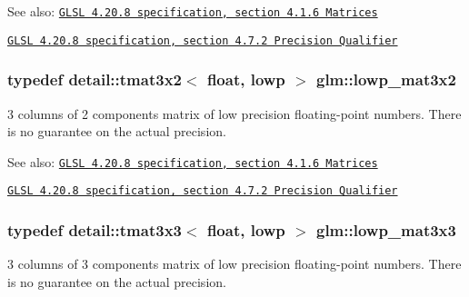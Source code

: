 \begin{Desc}
\item[See also:]\href{http://www.opengl.org/registry/doc/GLSLangSpec.4.20.8.pdf}{\tt GLSL 4.20.8 specification, section 4.1.6 Matrices} 

\href{http://www.opengl.org/registry/doc/GLSLangSpec.4.20.8.pdf}{\tt GLSL 4.20.8 specification, section 4.7.2 Precision Qualifier} \end{Desc}
\hypertarget{group__core__precision_g17219f89f804dbf4620d4caacf32cfe2}{
\subsubsection[lowp\_\-mat3x2]{\setlength{\rightskip}{0pt plus 5cm}typedef detail::tmat3x2$<$ float, lowp $>$ {\bf glm::lowp\_\-mat3x2}}}
\label{group__core__precision_g17219f89f804dbf4620d4caacf32cfe2}


3 columns of 2 components matrix of low precision floating-point numbers. There is no guarantee on the actual precision.

\begin{Desc}
\item[See also:]\href{http://www.opengl.org/registry/doc/GLSLangSpec.4.20.8.pdf}{\tt GLSL 4.20.8 specification, section 4.1.6 Matrices} 

\href{http://www.opengl.org/registry/doc/GLSLangSpec.4.20.8.pdf}{\tt GLSL 4.20.8 specification, section 4.7.2 Precision Qualifier} \end{Desc}
\hypertarget{group__core__precision_g31688b397d10806ead332c3adb7dc0f0}{
\subsubsection[lowp\_\-mat3x3]{\setlength{\rightskip}{0pt plus 5cm}typedef detail::tmat3x3$<$ float, lowp $>$ {\bf glm::lowp\_\-mat3x3}}}
\label{group__core__precision_g31688b397d10806ead332c3adb7dc0f0}


3 columns of 3 components matrix of low precision floating-point numbers. There is no guarantee on the actual precision.

